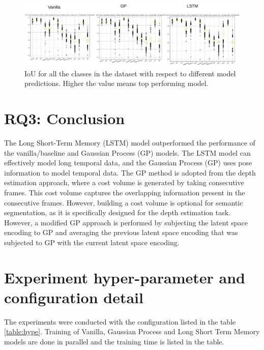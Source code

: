 	\begin{figure}
		\centering
		\hspace*{-2cm}
		\includegraphics[width=20cm]{images/IoU_five.png}
		\caption{IoU for all the classes in the dataset with respect to different model predictions. Higher the value means top performing model.}
		\label{fig:performance_metric_three_classes_unet_five}
	\end{figure}
	
	
	\section{RQ3: Conclusion}   
	
	The Long Short-Term Memory (LSTM) model outperformed the performance of the vanilla/baseline and Gaussian Process (GP) models. The LSTM model can effectively model long temporal data, and the Gaussian Process (GP) uses pose information to model temporal data. The GP method is adopted from the depth estimation approach, where a cost volume is generated by taking consecutive frames. This cost volume captures the overlapping information present in the consecutive frames. However, building a cost volume is optional for semantic segmentation, as it is specifically designed for the depth estimation task.
	However, a modified GP approach is performed by subjecting the latent space encoding to GP and averaging the previous latent space encoding that was subjected to GP with the current latent space encoding.
	
	\newpage
	\section{Experiment hyper-parameter and configuration detail }
	
	The experiments were conducted with the configuration listed in the table \ref{table:hype}. Training of Vanilla, Gaussian Process and Long Short Term Memory models are done in parallel and the training time is listed in the table.
	
